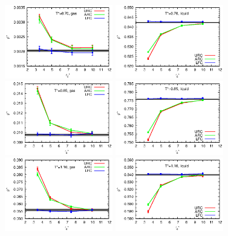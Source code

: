 \documentclass[aps,pre,preprint]{revtex4-1}
\begin{document}
\begin{figure}
  \centering
  \includegraphics[width=0.42\textwidth]{fig/converge.new/t0.70.gas.eps} 
  \includegraphics[width=0.42\textwidth]{fig/converge.new/t0.70.liquid.eps} 
  \includegraphics[width=0.42\textwidth]{fig/converge.new/t0.85.gas.eps} 
  \includegraphics[width=0.42\textwidth]{fig/converge.new/t0.85.liquid.eps} 
  \includegraphics[width=0.42\textwidth]{fig/converge.new/t1.10.gas.eps} 
  \includegraphics[width=0.42\textwidth]{fig/converge.new/t1.10.liquid.eps} 

\end{figure}
\end{document}
